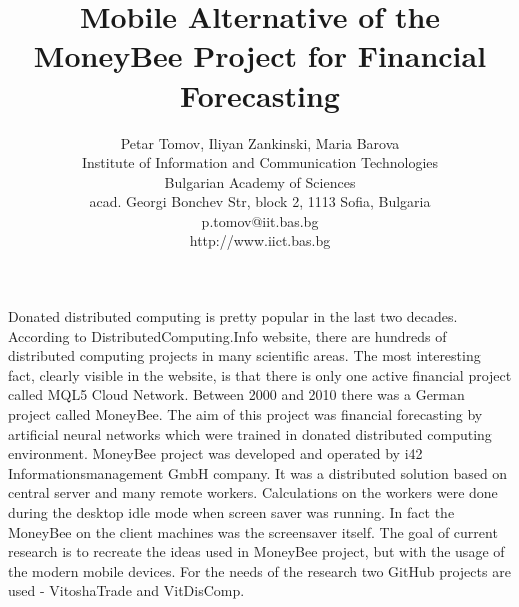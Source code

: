 \documentclass[12pt,a4paper]{article}
\title{\bf Mobile Alternative of the MoneyBee Project for Financial Forecasting}
\author{Petar Tomov, Iliyan Zankinski, Maria Barova \\
Institute of Information and Communication Technologies \\
Bulgarian Academy of Sciences \\
acad. Georgi Bonchev Str, block 2, 1113 Sofia, Bulgaria \\
p.tomov@iit.bas.bg \\
http://www.iict.bas.bg}
\date{}
\begin{document}
\maketitle

Donated distributed computing is pretty popular in the last two decades. According to DistributedComputing.Info website, there are hundreds of distributed computing projects in many scientific areas. The most interesting fact, clearly visible in the website, is that there is only one active financial project called MQL5 Cloud Network. Between 2000 and 2010 there was a German project called MoneyBee. The aim of this project was financial forecasting by artificial neural networks which were trained in donated distributed computing environment. MoneyBee project was developed and operated by i42 Informationsmanagement GmbH company. It was a distributed solution based on central server and many remote workers. Calculations on the workers were done during the desktop idle mode when screen saver was running. In fact the MoneyBee on the client machines was the screensaver itself. The goal of current research is to recreate the ideas used in MoneyBee project, but with the usage of the modern mobile devices. For the needs of the research two GitHub projects are used - VitoshaTrade and VitDisComp.
\end{document}
